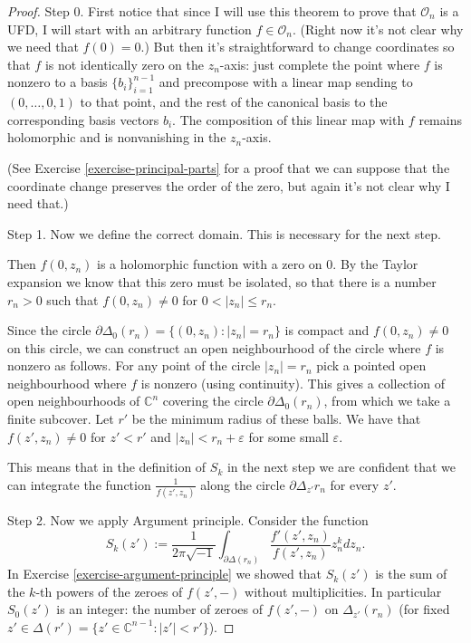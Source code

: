 \begin{proof}
Step 0. First notice that since I will use this theorem
to prove that $\mathcal{O}_n$ is a UFD, I will start with
an arbitrary function $f \in \mathcal{O}_n$.
(Right now it's not clear why we need that $f(0)=0$.)
But then it's straightforward to change coordinates so that $f$
is not identically zero on the  $z_n$-axis:
just complete the point where $f$ is nonzero to a basis $\{b_i\}_{i=1}^{n-1}$
and precompose with a linear map sending to $(0,\ldots,0,1)$
to that point, and the rest of the canonical basis
to the corresponding basis vectors $b_i$.
The composition of this linear map with $f$ remains holomorphic
and is nonvanishing in the $z_n$-axis.

(See Exercise \ref{exercise-principal-parts} for a proof that we can suppose
that the coordinate change preserves the order of the zero,
but again it's not clear why I need that.)

\medskip\noindent
Step 1. Now we define the correct domain.
This is necessary for the next step.

Then $f(0,z_n)$ is a holomorphic function with a zero on $0$. By
the Taylor expansion we know that this zero must be isolated, so that there is a
number $r_n>0$ such that $f(0,z_n)\neq 0$ for  $0<|z_n|\leq r_n$.

Since the circle $\partial\Delta_0(r_n)=\{(0,z_n):|z_n|=r_n\}$ is compact 
and $f(0,z_n)\neq 0$ on this circle, we can construct
an open neighbourhood of the circle where $f$ is nonzero as follows.
For any point of the circle $|z_n|=r_n$ 
pick a pointed open neighbourhood where $f$ is nonzero (using continuity).
This gives a collection of open neighbourhoods of $\mathbb{C}^n$ 
covering the circle $\partial\Delta_{0}(r_n)$,
from which we take a finite subcover.
Let $r'$ be the minimum radius of these balls.
We have that $f(z',z_n)\neq 0$ for $z'<r'$ and  $|z_n|<r_n+\varepsilon$ 
for some small $\varepsilon$.

This means that in the definition of $S_k$ in the next
step we are confident that we can integrate the function
$\frac{1}{f(z',z_n)}$ along the circle $\partial\Delta_{z'}r_n$ 
for every $z'$.

\medskip\noindent
Step 2. Now we apply Argument principle.
Consider the function
$$
S_k(z'):=\frac{1}{2\pi\sqrt{-1}}
\int_{\partial\Delta(r_n)}
\frac{f'(z',z_n)}{f(z',z_n)}z_n^kdz_n.
$$
In Exercise \ref{exercise-argument-principle}
we showed that $S_k(z')$ is the sum of the $k$-th powers of
the zeroes of  $f(z',-)$ without multiplicities.
In particular 
$S_0(z')$ is an integer: the number of
zeroes of $f(z',-)$ on $\Delta_{z'}(r_n)$ (for fixed 
$z' \in \Delta(r')=\{z' \in \mathbb{C}^{n-1}:|z'|<r'\}$).


\end{proof}
